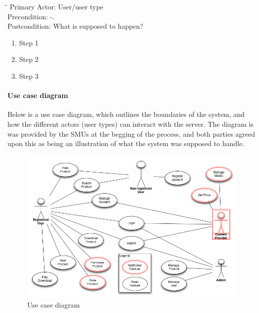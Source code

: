 \begin{tabbing}
\hspace{5mm}\=\hspace{26mm}\=\kill
\>Primary Actor:\> User/user type\\
\>Precondition:\> -.\\
\>Postcondition:\> What is supposed to happen?
\end{tabbing}
\begin{enumerate}
	\item Step 1
	\item Step 2
	\item Step 3
\end{enumerate}
\vspace{3mm}

\paragraph{Use case diagram}
Below is a use case diagram, which outlines the boundaries of the system, and how the different actors (user types) can interact with the server.
The diagram is was provided by the SMUs at the begging of the process, and both parties agreed upon this as being an illustration of what the system was supposed to handle.
\begin{figure}[ht!]
\centering
\includegraphics[width=160mm]{illustrations/UseCase.png}
\caption{Use case diagram}
\label{useCaseImg}
\end{figure}